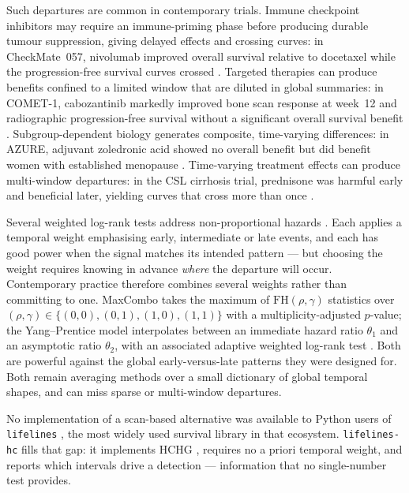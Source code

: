 \documentclass[11pt]{article}
\begin{document}
Such departures are common in contemporary trials. Immune checkpoint
inhibitors may require an immune-priming phase before producing durable
tumour suppression, giving delayed effects and crossing curves: in
CheckMate~057, nivolumab improved overall survival relative to docetaxel
while the progression-free survival curves crossed \citep{borghaei2015}.
Targeted therapies can produce benefits confined to a limited window that
are diluted in global summaries: in COMET-1, cabozantinib markedly improved
bone scan response at week~12 and radiographic progression-free survival
without a significant overall survival benefit \citep{smith2016}.
Subgroup-dependent biology generates composite, time-varying differences:
in AZURE, adjuvant zoledronic acid showed no overall benefit but did
benefit women with established menopause \citep{coleman2011,coleman2014}.
Time-varying treatment effects can produce multi-window departures: in the
CSL cirrhosis trial, prednisone was harmful early and beneficial later,
yielding curves that cross more than once \citep{csl_data}.

Several weighted log-rank tests address non-proportional hazards
\citep{gehan1965,peto1972,taroneware1977,harrington1982,flemingharrington1991}.
Each applies a temporal weight emphasising early, intermediate or late
events, and each has good power when the signal matches its intended
pattern --- but choosing the weight requires knowing in advance
\emph{where} the departure will occur. Contemporary practice therefore
combines several weights rather than committing to one. MaxCombo
\citep{lin2020maxcombo,ristl2021nph} takes the maximum of
$\mathrm{FH}(\rho,\gamma)$ statistics over
$(\rho,\gamma)\in\{(0,0),(0,1),(1,0),(1,1)\}$ with a multiplicity-adjusted
$p$-value; the Yang--Prentice model \citep{yang2005} interpolates between
an immediate hazard ratio $\theta_1$ and an asymptotic ratio $\theta_2$,
with an associated adaptive weighted log-rank test \citep{yang2010improved}.
Both are powerful against the global early-versus-late patterns they were
designed for. Both remain averaging methods over a small dictionary of
global temporal shapes, and can miss sparse or multi-window departures.

No implementation of a scan-based alternative was available to Python users
of \texttt{lifelines} \citep{davidsonpilon2019}, the most widely used
survival library in that ecosystem. \texttt{lifelines-hc} fills that gap:
it implements HCHG \citep{kipnis_biometrika}, requires no a priori temporal
weight, and reports which intervals drive a detection --- information that
no single-number test provides.
\end{document}
